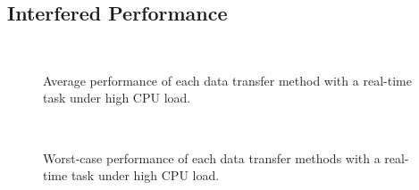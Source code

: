 \subsection{Interfered Performance}

\begin{figure}[!t]
 \begin{center}
  \\
  \caption{Average performance of each data transfer method with a
  real-time task under high CPU load.}
  \label{fig:average_realtime_cpuload}
 \end{center}
 \vspace{0.5em}
 \begin{center}
  \\
  \caption{Worst-case performance of each data transfer methods with a
  real-time task under high CPU load.}
  \label{fig:worst_realtime_cpuload}
  \end{center}
\end{figure}

